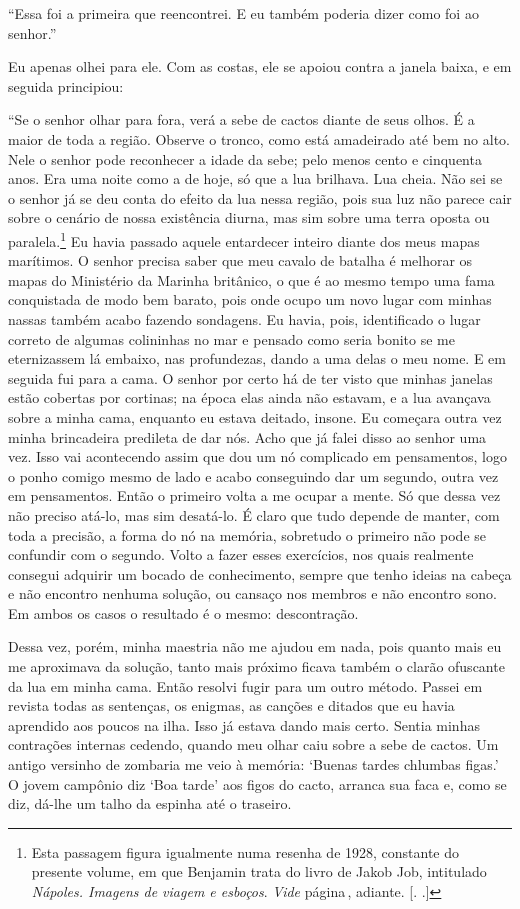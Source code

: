 ``Essa foi a primeira que reencontrei. E eu também poderia dizer como
foi ao senhor.''

Eu apenas olhei para ele. Com as costas, ele se apoiou contra a janela
baixa, e em seguida principiou:

``Se o senhor olhar para fora, verá a sebe de cactos diante de seus
olhos. É a maior de toda a região. Observe o tronco, como está
amadeirado até bem no alto. Nele o senhor pode reconhecer a idade da
sebe; pelo menos cento e cinquenta anos. Era uma noite como a de hoje,
só que a lua brilhava. Lua cheia. Não sei se o senhor já se deu conta do
efeito da lua nessa região, pois sua luz não parece cair sobre o cenário
de nossa existência diurna, mas sim sobre uma terra oposta ou
paralela.\footnote{Esta passagem figura igualmente numa resenha de 1928,
  constante do presente volume, em que Benjamin trata do livro de Jakob
  Job, intitulado \emph{Nápoles. Imagens de viagem e esboços}.
  \emph{Vide} página\,\pageref{supra10}, adiante. [. .]} Eu
havia passado aquele entardecer inteiro diante dos meus mapas marítimos.
O senhor precisa saber que meu cavalo de batalha é melhorar os mapas do
Ministério da Marinha britânico, o que é ao mesmo tempo uma fama
conquistada de modo bem barato, pois onde ocupo um novo lugar com minhas
nassas também acabo fazendo sondagens. Eu havia, pois, identificado o
lugar correto de algumas colininhas no mar e pensado como seria bonito
se me eternizassem lá embaixo, nas profundezas, dando a uma delas o meu
nome. E em seguida fui para a cama. O senhor por certo há de ter visto
que minhas janelas estão cobertas por cortinas; na época elas ainda não
estavam, e a lua avançava sobre a minha cama, enquanto eu estava
deitado, insone. Eu começara outra vez minha brincadeira predileta de
dar nós. Acho que já falei disso ao senhor uma vez. Isso vai acontecendo
assim que dou um nó complicado em pensamentos, logo o ponho comigo mesmo
de lado e acabo conseguindo dar um segundo, outra vez em pensamentos.
Então o primeiro volta a me ocupar a mente. Só que dessa vez não preciso
atá-lo, mas sim desatá-lo. É claro que tudo depende de manter, com toda
a precisão, a forma do nó na memória, sobretudo o primeiro não pode se
confundir com o segundo. Volto a fazer esses exercícios, nos quais
realmente consegui adquirir um bocado de conhecimento, sempre que tenho
ideias na cabeça e não encontro nenhuma solução, ou cansaço nos membros
e não encontro sono. Em ambos os casos o resultado é o mesmo:
descontração.

Dessa vez, porém, minha maestria não me ajudou em nada, pois quanto mais
eu me aproximava da solução, tanto mais próximo ficava também o clarão
ofuscante da lua em minha cama. Então resolvi fugir para um outro
método. Passei em revista todas as sentenças, os enigmas, as canções e
ditados que eu havia aprendido aos poucos na ilha. Isso já estava dando
mais certo. Sentia minhas contrações internas cedendo, quando meu olhar
caiu sobre a sebe de cactos. Um antigo versinho de zombaria me veio à
memória: `Buenas tardes chlumbas figas.' O jovem campônio diz `Boa
tarde' aos figos do cacto, arranca sua faca e, como se diz, dá-lhe um
talho da espinha até o traseiro.

